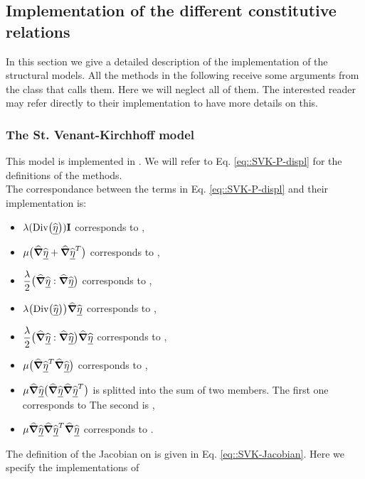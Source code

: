 \subsection{Implementation of the different constitutive relations} In
this section we give a detailed description of the implementation of
the structural models. All the methods in the following receive some
arguments from the class that calls them. Here we will neglect all of
them. The interested reader may refer directly to their implementation
to have more details on this.


\subsubsection{The St. Venant-Kirchhoff model} This model is
implemented in . We will
refer to Eq. \eqref{eq::SVK-P-displ} for the definitions of the
methods.\\ The correspondance between the terms in
Eq. \eqref{eq::SVK-P-displ} and their implementation is:
\begin{itemize}
\item $\displaystyle \lambda(\text{Div}\big(\widehat{\underline{\eta}}\big))\textbf{I}$ corresponds to
  ,
\item $\displaystyle \mu\big(\widehat{\boldsymbol{\nabla}}\widehat{\underline{\eta}} + \widehat{\boldsymbol{\nabla}}\widehat{\underline{\eta}}^T\big)$
  corresponds to ,
\item $\displaystyle
  \frac{\lambda}{2}\big(\widehat{\boldsymbol{\nabla}}\widehat{\underline{\eta}}:\widehat{\boldsymbol{\nabla}}\widehat{\underline{\eta}}\big)$ corresponds to
  ,
\item $\displaystyle \lambda\big(\text{Div}\big(\widehat{\underline{\eta}}\big)\big)\widehat{\boldsymbol{\nabla}}\widehat{\underline{\eta}}$
  corresponds to ,
\item $\displaystyle
  \frac{\lambda}{2}\big(\widehat{\boldsymbol{\nabla}}\widehat{\underline{\eta}}:\widehat{\boldsymbol{\nabla}}\widehat{\underline{\eta}}\big)\widehat{\boldsymbol{\nabla}}\widehat{\underline{\eta}}$
  corresponds to ,
\item $\displaystyle \mu\big(\widehat{\boldsymbol{\nabla}}\widehat{\underline{\eta}}^T \widehat{\boldsymbol{\nabla}}\widehat{\underline{\eta}}\big)$
  corresponds to ,
\item $\displaystyle
  \mu\widehat{\boldsymbol{\nabla}}\widehat{\underline{\eta}}\big(\widehat{\boldsymbol{\nabla}}\widehat{\underline{\eta}}\widehat{\boldsymbol{\nabla}}\widehat{\underline{\eta}}^T\big)$ is splitted
  into the sum of two members. The first one corresponds to
   The second is
  ,
\item $\displaystyle \mu\widehat{\boldsymbol{\nabla}}\widehat{\underline{\eta}}\widehat{\boldsymbol{\nabla}}\widehat{\underline{\eta}}^T\widehat{\boldsymbol{\nabla}}\widehat{\underline{\eta}}$
  corresponds to .
\end{itemize}
The definition of the Jacobian on \Piola{} is given in
Eq. \eqref{eq::SVK-Jacobian}. Here we specify the implementations of
